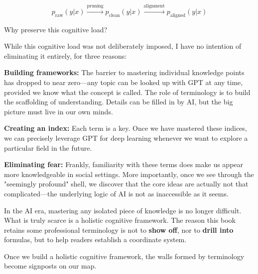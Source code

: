 \begin{myquote}
    \begin{equation*}
    p_{\text{raw}}(y|x) \xrightarrow{\text{pruning}} p_{\text{clean}}(y|x) \xrightarrow{\text{alignment}} p_{\text{aligned}}(y|x)
    \end{equation*}
\end{myquote}

Why preserve this cognitive load?


While this cognitive load was not deliberately imposed, I have no intention of eliminating it entirely, for three reasons:

\textbf{Building frameworks:} The barrier to mastering individual knowledge points has dropped to near zero---any topic can be looked up with GPT at any time, provided we know what the concept is called. The role of terminology is to build the scaffolding of understanding. Details can be filled in by AI, but the big picture must live in our own minds.

\textbf{Creating an index:} Each term is a key. Once we have mastered these indices, we can precisely leverage GPT for deep learning whenever we want to explore a particular field in the future.

\textbf{Eliminating fear:} Frankly, familiarity with these terms does make us appear more knowledgeable in social settings. More importantly, once we see through the "seemingly profound" shell, we discover that the core ideas are actually not that complicated---the underlying logic of AI is not as inaccessible as it seems.

In the AI era, mastering any isolated piece of knowledge is no longer difficult. What is truly scarce is a holistic cognitive framework. The reason this book retains some professional terminology is not to \textbf{show off}, nor to \textbf{drill into} formulas, but to help readers establish a coordinate system.

\vspace{1em}

Once we build a holistic cognitive framework, the walls formed by terminology become signposts on our map.
